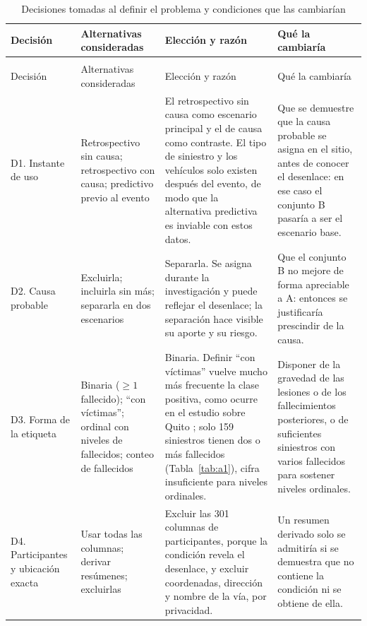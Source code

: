 \begin{longtable}{>{\raggedright\arraybackslash}p{2.0cm}>{\raggedright\arraybackslash}p{2.8cm}>{\raggedright\arraybackslash}p{5.1cm}>{\raggedright\arraybackslash}p{4.0cm}}
\caption{Decisiones tomadas al definir el problema y condiciones que las cambiarían}
\label{tab:decisiones}\\
\toprule
Decisión & Alternativas consideradas & Elección y razón & Qué la cambiaría \\
\midrule
\endfirsthead
\multicolumn{4}{l}{\footnotesize\itshape (continuación)}\\
\toprule
Decisión & Alternativas consideradas & Elección y razón & Qué la cambiaría \\
\midrule
\endhead
\bottomrule
\endfoot
D1. Instante de uso & Retrospectivo sin causa; retrospectivo con causa; predictivo previo al evento & El retrospectivo sin causa como escenario principal y el de causa como contraste. El tipo de siniestro y los vehículos solo existen después del evento, de modo que la alternativa predictiva es inviable con estos datos. & Que se demuestre que la causa probable se asigna en el sitio, antes de conocer el desenlace: en ese caso el conjunto B pasaría a ser el escenario base. \\
D2. Causa probable & Excluirla; incluirla sin más; separarla en dos escenarios & Separarla. Se asigna durante la investigación y puede reflejar el desenlace; la separación hace visible su aporte y su riesgo. & Que el conjunto B no mejore de forma apreciable a A: entonces se justificaría prescindir de la causa. \\
D3. Forma de la etiqueta & Binaria ($\geq 1$ fallecido); ``con víctimas''; ordinal con niveles de fallecidos; conteo de fallecidos & Binaria. Definir ``con víctimas'' vuelve mucho más frecuente la clase positiva, como ocurre en el estudio sobre Quito \cite{ref3}; solo 159 siniestros tienen dos o más fallecidos (Tabla~\ref{tab:a1}), cifra insuficiente para niveles ordinales. & Disponer de la gravedad de las lesiones o de los fallecimientos posteriores, o de suficientes siniestros con varios fallecidos para sostener niveles ordinales. \\
D4. Participantes y ubicación exacta & Usar todas las columnas; derivar resúmenes; excluirlas & Excluir las 301 columnas de participantes, porque la condición revela el desenlace, y excluir coordenadas, dirección y nombre de la vía, por privacidad. & Un resumen derivado solo se admitiría si se demuestra que no contiene la condición ni se obtiene de ella. \\
\end{longtable}
